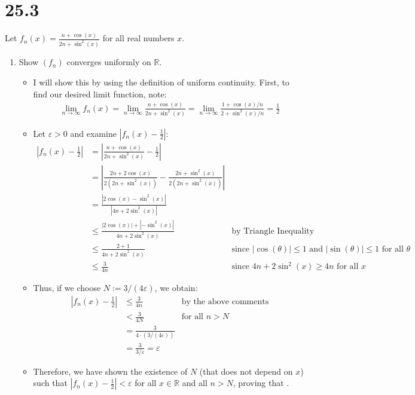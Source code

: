 \documentclass[10pt,a4paper]{article}
\theoremstyle{definition}
\begin{document}
\section*{25.3}
Let $\displaystyle f_n(x) = \frac{n + \cos(x)}{2n + \sin^2(x)}$ for all real numbers $x$. 
\begin{enumerate}[label =(\alph*)]
\item Show $(f_n)$ converges uniformly on $\mathbb{R}$. 
	\begin{itemize}
	\item I will show this by using the definition of uniform continuity. First, to find our desired limit function, note:
	\begin{align*}
	\lim_{n \to \infty} f_n(x) = \lim_{n \to \infty} \frac{n + \cos(x)}{2n + \sin^2(x)} = \lim_{n \to \infty} \frac{1 + \cos(x)/n}{2 + \sin^2(x)/n} = \frac{1}{2}
	\end{align*}
	\item Let $\varepsilon > 0$ and examine $\left|f_n(x) - \frac{1}{2}\right|$:
	\begin{align*}
	\left|f_n(x) - \frac{1}{2}\right| &= \left|\frac{n + \cos(x)}{2n + \sin^2(x)} - \frac{1}{2}\right|\\
	&= \left|\frac{2n + 2\cos(x)}{2(2n + \sin^2(x))} - \frac{2n + \sin^2(x)}{2(2n + \sin^2(x))}\right|\\
	&= \frac{|2\cos(x) - \sin^2(x)|}{|4n + 2\sin^2(x)|}\\
	&\leq \frac{|2\cos(x)| + |-\sin^2(x)|}{4n + 2\sin^2(x)} &\text{by Triangle Inequality}\\
	&\leq \frac{2 + 1}{4n + 2\sin^2(x)} &\text{since $|\cos(\theta)| \leq 1$ and $|\sin(\theta)| \leq 1$ for all $\theta$}\\
	&\leq \frac{3}{4n} &\text{since $4n + 2\sin^2(x) \geq 4n$ for all $x$}
	\end{align*}
	\item Thus, if we choose $N := 3/(4\varepsilon)$, we obtain:
	\begin{align*}
	\left|f_n(x) - \frac{1}{2}\right| &\leq \frac{3}{4n} &\text{by the above comments}\\
	&< \frac{3}{4N} &\text{for all $n > N$}\\
	&= \frac{3}{4\cdot(3/(4\varepsilon))}\\
	&= \frac{3}{3/\varepsilon} = \varepsilon
	\end{align*}
	\item Therefore, we have shown the existence of $N$ (that does not depend on $x$) such that $\left|f_n(x) - \frac{1}{2}\right| < \varepsilon$ for all $x \in \mathbb{R}$ and all $n > N$, proving that .

\end{itemize}
\end{enumerate}
\end{document}
